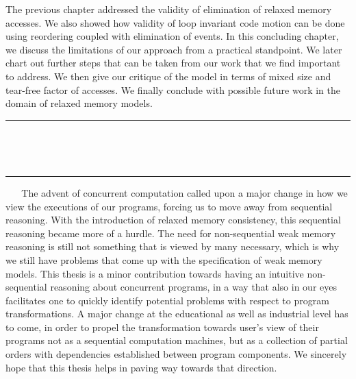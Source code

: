 The previous chapter addressed the validity of elimination of relaxed memory accesses. 
We also showed how validity of loop invariant code motion can be done using reordering coupled with elimination of events. 
In this concluding chapter, we discuss the limitations of our approach from a practical standpoint.
We later chart out further steps that can be taken from our work that we find important to address.
We then give our critique of the model in terms of mixed size and tear-free factor of accesses. 
We finally conclude with possible future work in the domain of relaxed memory models.
\ \newline
\ \newline  
\hrule 
\ \newline 
\ \newline 









\ \newline
\ \newline  
\hrule 
\ \newline 
\ \newline 
The advent of concurrent computation called upon a major change in how we view the executions of our programs, forcing us to move away from sequential reasoning.
With the introduction of relaxed memory consistency, this sequential reasoning became more of a hurdle.
The need for non-sequential weak memory reasoning is still not something that is viewed by many necessary, which is why we still have problems that come up with the specification of weak memory models.
This thesis is a minor contribution towards having an intuitive non-sequential reasoning about concurrent programs, in a way that also in our eyes facilitates one to quickly identify potential problems with respect to program transformations. 
A major change at the educational as well as industrial level has to come, in order to propel the transformation towards user's view of their programs not as a sequential computation machines, but as a collection of partial orders with dependencies established between program components.
We sincerely hope that this thesis helps in paving way towards that direction.
